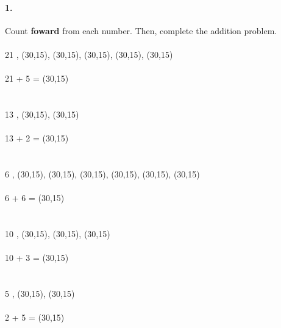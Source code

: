 \documentclass[12pt]{article}
\begin{document}
\paragraph{1.}
Count \textbf{foward} from each number. Then, complete the addition problem. \\
\\
21 , \framebox(30,15){}, \framebox(30,15){}, \framebox(30,15){}, \framebox(30,15){}, \framebox(30,15){}
\\
\\
21 + 5 = \framebox(30,15){}
\\
\\
\\
13 , \framebox(30,15){}, \framebox(30,15){}
\\
\\
13 + 2 = \framebox(30,15){}
\\
\\
\\
6 , \framebox(30,15){}, \framebox(30,15){}, \framebox(30,15){}, \framebox(30,15){}, \framebox(30,15){}, \framebox(30,15){}
\\
\\
6 + 6 = \framebox(30,15){}
\\
\\
\\
10 , \framebox(30,15){}, \framebox(30,15){}, \framebox(30,15){}
\\
\\
10 + 3 = \framebox(30,15){}
\\
\\
\\
5 , \framebox(30,15){}, \framebox(30,15){}
\\
\\
2 + 5 = \framebox(30,15){}

\newpage
\end{document}
